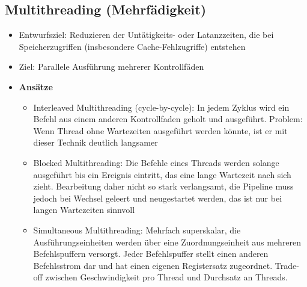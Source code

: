 	\subsection{Multithreading (Mehrfädigkeit)}
		\begin{itemize}
			\item Entwurfsziel: Reduzieren der Untätigkeits- oder Latanzzeiten, die bei Speicherzugriffen (insbesondere Cache-Fehlzugriffe) entstehen
			\item Ziel: Parallele Ausführung mehrerer Kontrollfäden
			\item \textbf{Ansätze}
			\begin{itemize}
				\item Interleaved Multithreading (cycle-by-cycle): In jedem Zyklus wird ein Befehl aus einem anderen Kontrollfaden geholt und ausgeführt. Problem: Wenn Thread ohne Wartezeiten ausgeführt werden könnte, ist er mit dieser Technik deutlich langsamer
				\item Blocked Multithreading: Die Befehle eines Threads werden solange ausgeführt bis ein Ereignis eintritt, das eine lange Wartezeit nach sich zieht. Bearbeitung daher nicht so stark verlangsamt, die Pipeline muss jedoch bei Wechsel geleert und neugestartet werden, das ist nur bei langen Wartezeiten sinnvoll
				\item Simultaneous Multithreading: Mehrfach superskalar, die Ausführungseinheiten werden über eine Zuordnungseinheit aus mehreren Befehlspuffern versorgt. Jeder Befehlspuffer stellt einen anderen Befehlsstrom dar und hat einen eigenen Registersatz zugeordnet. Trade-off zwischen Geschwindigkeit pro Thread und Durchsatz an Threads.
			\end{itemize}
		\end{itemize}

